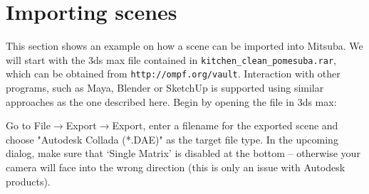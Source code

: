 \section{Importing scenes}
This section shows an example on how a scene can be imported into Mitsuba.
We will start with the 3ds max file contained in \texttt{kitchen\_clean\_pomesuba.rar}, which can be obtained from \texttt{http://ompf.org/vault}.
Interaction with other programs, such as Maya, Blender or SketchUp is supported using similar approaches as the one described here.
Begin by opening the file in 3ds max:
\begin{center}
\end{center}
Go to File$\to$Export$\to$Export, enter a filename for the exported scene and choose "Autodesk Collada (*.DAE)" as the target file type.
In the upcoming dialog, make sure that `Single Matrix' is disabled at the bottom -- otherwise your camera will face into the 
wrong direction (this is only an issue with Autodesk products).
